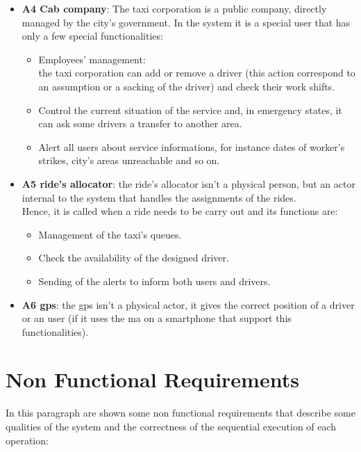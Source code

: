 \begin{itemize}
	\item \textbf{A4 Cab company}: The taxi corporation is a public company, directly managed by the city's government. In the system it is a special \gls{user} that has only a few special functionalities:
	\begin{itemize}
		\item Employees' management:\\
		the taxi corporation can add or remove a \gls{driver} (this action correspond to an assumption or a sacking of the \gls{driver}) and check their work shifts.
		\item Control the current situation of the service and, in emergency states, it can ask some \glspl{driver} a transfer to another area.
		\item Alert all \glspl{user} about service informations, for instance dates of worker's strikes, city's areas unreachable and so on.
	\end{itemize}
	
	\item \textbf{A5 \Gls{ride}'s allocator}:	the \gls{ride}'s allocator isn't a physical person, but an actor internal to the system that handles the assignments of the \glspl{ride}.\\
Hence, it is called when a \gls{ride} needs to be carry out and its functions are:
	\begin{itemize}
		\item Management of the taxi's queues.
		\item Check the availability of the designed \gls{driver}.
		\item Sending of the \glspl{alert} to inform both \glspl{user} and \glspl{driver}.
	\end{itemize}

	\item \textbf{A6 \gls{gps}}: the \gls{gps} isn't a physical actor, it gives the correct position of a \gls{driver} or an \gls{user} (if it uses the \gls{ma} on a smartphone that support this functionalities).
	
\end{itemize}

\section{Non Functional Requirements}
In this paragraph are shown some non functional requirements that describe some qualities of the system and the correctness of the sequential execution of each operation:


